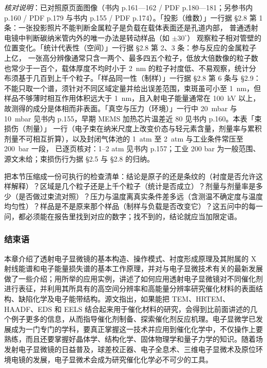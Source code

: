 \emph{核对说明}：已对照原页面图像（书内 p.161—162 / PDF p.180—181；另参书内
p.160 / PDF p.179 与书内 p.155 / PDF p.174）。「投影（维数）」一行据 §2.8
第 1 条：一张投影照片不能判断金属粒子是负载在载体表面还是孔道内部，
普通透射电镜中判断碳纳米管内外的唯一办法是转动样品（如 $\pm 30^{\circ}$）
观察粒子相对管壁的位置变化。「统计代表性（空间）」一行据 §2.8 第 2、3 条：参与反应的金属粒子上亿，
一张高分辨像通常只含一两个、最多四五个粒子，低放大倍数像的粒子数也常少于一百个，载体厚度不均时小于
\qty{2}{nm} 的粒子衬度低、不易观察，统计分布须基于几百到上千个粒子。「样品同一性（制样）」一行据
§2.8 第 6 条与 §2.9：不能只取一个谱，须针对不同区域定量并给出误差范围，束斑虽可小至
\qty{1}{nm}，但样品不够薄时相互作用体积远大于 \qty{1}{nm}，且入射电子能量通常在
\qty{100}{kV} 以上，故测得的成分是体相而非表面。「真空与压力（环境）」一行中
\qty{20}{mbar} 与 \qty{10}{mbar} 见书内 p.155，早期 MEMS 加热芯片温差近
\qty{80}{\degC} 见书内 p.160。本表「束损伤（剂量）」
一行（电子束在纳米尺度上改变价态与轻元素含量，剂量率与累积剂量不可相互折算），以及封闭气体池的
\qty{1}{atm} 至 \qty{2}{atm} 与工业条件常压至 \qty{200}{bar} 一段，
已逐页核对：1–2 atm 见书内 p.157；工业 200 bar 为一般范围、源文未给；束损伤行为据 §2.5 与 §2.8 的归纳。


\begin{crosscheck}
把本节压缩成一份可执行的检查清单：结论是原子的还是条纹的（衬度是否允许这样解释）？区域是几个粒子还是上千个粒子（统计是否成立）？剂量与剂量率是多少（是否做过束流对照）？压力与温度离真实条件差多远（含测温不确定度与温度均匀性）？样品是不是原来那个样品（制样与负载是否改变它）？这五问中的每一问，都必须能在报告里找到对应的数字；找不到的，结论就应当加限定语。
\end{crosscheck}

\subsubsection{结束语}

本章介绍了透射电子显微镜的基本构造、操作模式、衬度形成原理及其附属的 X 射线能谱和电子能量损失谱的基本工作原理，并对与电子显微技术有关的最新发展做了一些介绍；用所举的应用实例，讲述了如何应用透射电子显微镜对不同催化剂进行表征，并利用其所具有的高空间分辨率和高能量分辨率研究催化材料的表面结构、缺陷化学及电子能带结构。源文指出，如果能把 TEM、HRTEM、HAADF、EDS 和 EELS 结合起来用于催化材料的研究，会得到比前面讲述的几个例子更多的信息，从而指导催化剂制备、探索催化剂反应机理。电子显微学已发展成为一门专门的学科，要真正掌握这一技术并应用到催化化学中，不仅操作上要熟练，而且还要掌握好晶体学、结构化学、固体物理学和量子力学的知识。随着场发射电子显微镜的日益普及，球差校正器、电子全息术、三维电子显微术及原位环境电镜的发展，电子显微术会成为研究催化化学必不可少的工具。

